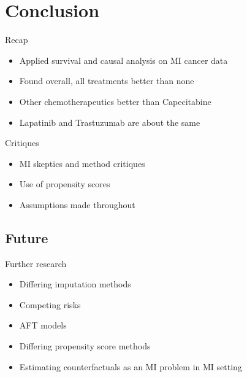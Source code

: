\section{Conclusion}

\begin{frame}{Recap}
 \begin{itemize}
  \item Applied survival and causal analysis on MI cancer data
  \item Found overall, all treatments better than none
  \item Other chemotherapeutics better than Capecitabine
  \item Lapatinib and Trastuzumab are about the same
 \end{itemize}

\end{frame}


\begin{frame}{Critiques}
 \begin{itemize}
  \item MI skeptics and method critiques
  \item Use of propensity scores
  \item Assumptions made throughout
  \end{itemize}

\end{frame}

\subsection{Future}
\begin{frame}{Further research}

\begin{itemize}
 \item Differing imputation methods
 \item Competing risks
 \item AFT models
 \item Differing propensity score methods
 \item Estimating counterfactuals as an MI problem in MI setting
 
\end{itemize}

 
\end{frame}

